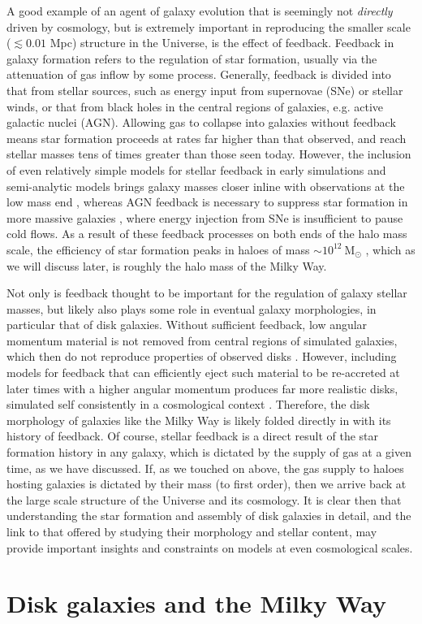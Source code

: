 A good example of an agent of galaxy evolution that is seemingly not \emph{directly} driven by cosmology, but is extremely important in reproducing the smaller scale ($\lesssim 0.01$ Mpc) structure in the Universe, is the effect of feedback. Feedback in galaxy formation refers to the regulation of star formation, usually via the attenuation of gas inflow by some process. Generally, feedback is divided into that from stellar sources, such as energy input from supernovae (SNe) or stellar winds, or that from black holes in the central regions of galaxies, e.g. active galactic nuclei (AGN). Allowing gas to collapse into galaxies without feedback means star formation proceeds at rates far higher than that observed, and reach stellar masses tens of times greater than those seen today. However, the inclusion of even relatively simple models for stellar feedback in early simulations and semi-analytic models brings galaxy masses closer inline with observations at the low mass end  \citep[$M\lesssim 10^{12}\ \mathrm{M_\odot}$ e.g.][]{1996ApJS..105...19K,1999MNRAS.310.1087S,2003MNRAS.339..312S}, whereas AGN feedback is necessary to suppress star formation in more massive galaxies \citep[$M\gtrsim 10^{12}\ \mathrm{M_\odot}$][]{2006MNRAS.370..645B,2008MNRAS.391..481S}, where energy injection from SNe is insufficient to pause cold flows. As a result of these feedback processes on both ends of the halo mass scale, the efficiency of star formation peaks in haloes of mass $\sim 10^{12}\ \mathrm{M_\odot}$ \citep[e.g.][]{2013ApJ...770...57B}, which as we will discuss later, is roughly the halo mass of the Milky Way. 

Not only is feedback thought to be important for the regulation of galaxy stellar masses, but likely also plays some role in eventual galaxy morphologies, in particular that of disk galaxies. Without sufficient feedback, low angular momentum material is not removed from central regions of simulated galaxies, which then do not reproduce properties of observed disks \citep[e.g.][and references therein]{2010MNRAS.408..812S}. However, including models for feedback that can efficiently eject such material to be re-accreted at later times with a higher angular momentum produces far more realistic disks, simulated self consistently in a cosmological context \citep[e.g.][]{2011MNRAS.415.1051B,2012MNRAS.427..379M,2013MNRAS.428..129S}. Therefore, the disk morphology of galaxies like the Milky Way is likely folded directly in with its history of feedback. Of course, stellar feedback is a direct result of the star formation history in any galaxy, which is dictated by the supply of gas at a given time, as we have discussed. If, as we touched on above, the gas supply to haloes hosting galaxies is dictated by their mass (to first order), then we arrive back at the large scale structure of the Universe and its cosmology. It is clear then that understanding the star formation and assembly of disk galaxies in detail, and the link to that offered by studying their morphology and stellar content, may provide important insights and constraints on models at even cosmological scales.

\section{Disk galaxies and the Milky Way}
